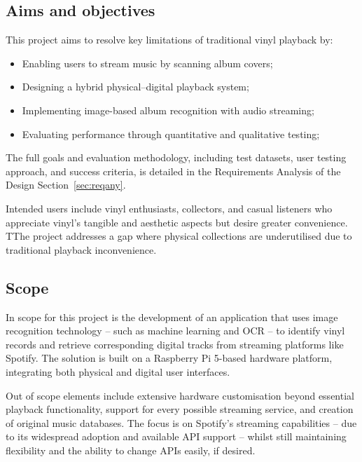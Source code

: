         \subsection{Aims and objectives}
    
            This project aims to resolve key limitations of traditional vinyl playback by:
            \begin{itemize}
                \item Enabling users to stream music by scanning album covers;
                \item Designing a hybrid physical–digital playback system;
                \item Implementing image-based album recognition with audio streaming;
                \item Evaluating performance through quantitative and qualitative testing;
            \end{itemize}
    
            The full goals and evaluation methodology, including test datasets, user testing approach, and success criteria, is detailed in the Requirements Analysis of the Design Section~\ref{sec:reqany}.
    
            Intended users include vinyl enthusiasts, collectors, and casual listeners who appreciate vinyl's tangible and aesthetic aspects but desire greater convenience. TThe project addresses a gap where physical collections are underutilised due to traditional playback inconvenience.
        
        \subsection{Scope}
    
            In scope for this project is the development of an application that uses image recognition technology -- such as machine learning and OCR -- to identify vinyl records and retrieve corresponding digital tracks from streaming platforms like Spotify. The solution is built on a Raspberry Pi 5-based hardware platform, integrating both physical and digital user interfaces.
    
            Out of scope elements include extensive hardware customisation beyond essential playback functionality, support for every possible streaming service, and creation of original music databases. The focus is on Spotify's streaming capabilities -- due to its widespread adoption and available API support -- whilst still maintaining flexibility and the ability to change APIs easily, if desired.
        

